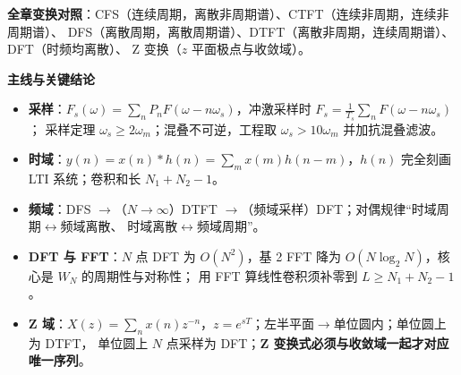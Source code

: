 \textbf{全章变换对照}：CFS（连续周期，离散非周期谱）、CTFT（连续非周期，连续非周期谱）、
DFS（离散周期，离散周期谱）、DTFT（离散非周期，连续周期谱）、DFT（时频均离散）、
Z 变换（$z$ 平面极点与收敛域）。

\textbf{主线与关键结论}
\begin{itemize}
\item \textbf{采样}：$F_s(\omega)=\sum_nP_nF(\omega-n\omega_s)$，冲激采样时 $F_s=\frac{1}{T_s}\sum_nF(\omega-n\omega_s)$；
  采样定理 $\omega_s\ge2\omega_m$；混叠不可逆，工程取 $\omega_s>10\omega_m$ 并加抗混叠滤波。
\item \textbf{时域}：$y(n)=x(n)*h(n)=\sum_mx(m)h(n-m)$，$h(n)$ 完全刻画 LTI 系统；卷积和长 $N_1+N_2-1$。
\item \textbf{频域}：DFS $\to$（$N\to\infty$）DTFT $\to$（频域采样）DFT；对偶规律“时域周期$\leftrightarrow$频域离散、
  时域离散$\leftrightarrow$频域周期”。
\item \textbf{DFT 与 FFT}：$N$ 点 DFT 为 $O(N^2)$，基 2 FFT 降为 $O(N\log_2N)$，核心是 $W_N$ 的周期性与对称性；
  用 FFT 算线性卷积须补零到 $L\ge N_1+N_2-1$。
\item \textbf{Z 域}：$X(z)=\sum_nx(n)z^{-n}$，$z=e^{sT}$；左半平面$\to$单位圆内；单位圆上为 DTFT，
  单位圆上 $N$ 点采样为 DFT；\textbf{Z 变换式必须与收敛域一起才对应唯一序列}。
\end{itemize}
